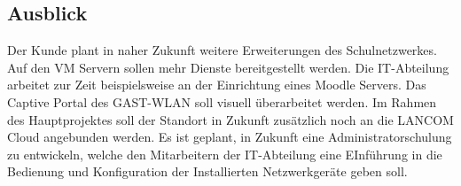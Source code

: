 \subsection{Ausblick}
\label{sec:Ausblick}
Der Kunde plant in naher Zukunft weitere Erweiterungen des Schulnetzwerkes. Auf den VM Servern sollen mehr Dienste bereitgestellt werden. Die IT-Abteilung arbeitet zur Zeit beispielsweise an der Einrichtung eines Moodle Servers. Das Captive Portal des GAST-WLAN soll visuell überarbeitet werden. Im Rahmen des Hauptprojektes soll der Standort in Zukunft zusätzlich noch an die LANCOM Cloud angebunden werden. Es ist geplant, in Zukunft eine Administratorschulung zu entwickeln, welche den Mitarbeitern der IT-Abteilung eine EInführung in die Bedienung und Konfiguration der Installierten Netzwerkgeräte geben soll. 
\clearpage
\begin{comment}
	\item Wie wird sich das Projekt in Zukunft weiterentwickeln (\zB geplante Erweiterungen)?
\end{comment}

